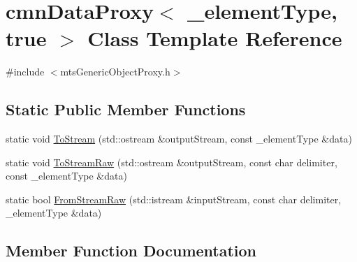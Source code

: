 \hypertarget{classcmn_data_proxy_3_01__element_type_00_01true_01_4}{}\section{cmn\+Data\+Proxy$<$ \+\_\+element\+Type, true $>$ Class Template Reference}
\label{classcmn_data_proxy_3_01__element_type_00_01true_01_4}


{\ttfamily \#include $<$mts\+Generic\+Object\+Proxy.\+h$>$}

\subsection*{Static Public Member Functions}
\begin{DoxyCompactItemize}
\item 
static void \hyperlink{classcmn_data_proxy_3_01__element_type_00_01true_01_4_a610dc86e1b589200a2c0a6278c75509d}{To\+Stream} (std\+::ostream \&output\+Stream, const \+\_\+element\+Type \&data)
\item 
static void \hyperlink{classcmn_data_proxy_3_01__element_type_00_01true_01_4_a364315ac8a63feedf30b9c7ad032364a}{To\+Stream\+Raw} (std\+::ostream \&output\+Stream, const char delimiter, const \+\_\+element\+Type \&data)
\item 
static bool \hyperlink{classcmn_data_proxy_3_01__element_type_00_01true_01_4_ae2c7be42ef43e78e34d39e3dea3e5442}{From\+Stream\+Raw} (std\+::istream \&input\+Stream, const char delimiter, \+\_\+element\+Type \&data)
\end{DoxyCompactItemize}


\subsection{Member Function Documentation}
\hypertarget{classcmn_data_proxy_3_01__element_type_00_01true_01_4_ae2c7be42ef43e78e34d39e3dea3e5442}{}
